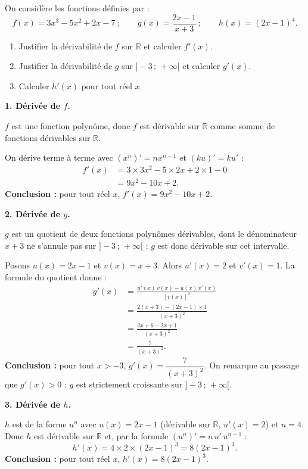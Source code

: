 \documentclass[11pt]{article}
\newcommand{\cle}[1]{{\popxbold\color{popdark}#1}}
\begin{document}
\begin{exoresolu}
On considère les fonctions définies par :
\[ f(x) = 3x^3 - 5x^2 + 2x - 7 \ ; \qquad g(x) = \frac{2x-1}{x+3} \ ; \qquad h(x) = (2x-1)^4. \]
\begin{enumerate}
\item Justifier la dérivabilité de $f$ sur $\mathbb{R}$ et calculer $f'(x)$.
\item Justifier la dérivabilité de $g$ sur $]-3\,;\,+\infty[$ et calculer $g'(x)$.
\item Calculer $h'(x)$ pour tout réel $x$.
\end{enumerate}
\tcblower
\textbf{1. Dérivée de $f$.}

$f$ est une fonction \cle{polynôme}, donc $f$ est dérivable sur $\mathbb{R}$ comme somme de fonctions dérivables sur $\mathbb{R}$.

On dérive terme à terme avec $(x^n)' = n x^{n-1}$ et $(ku)' = ku'$ :
\begin{align*}
f'(x) &= 3\times 3x^2 - 5\times 2x + 2\times 1 - 0 \\
&= 9x^2 - 10x + 2.
\end{align*}
\textbf{Conclusion :} pour tout réel $x$, $f'(x) = 9x^2 - 10x + 2$.

\textbf{2. Dérivée de $g$.}

$g$ est un \cle{quotient} de deux fonctions polynômes dérivables, dont le dénominateur $x+3$ ne s'annule pas sur $]-3\,;\,+\infty[$ : $g$ est donc dérivable sur cet intervalle.

Posons $u(x) = 2x-1$ et $v(x) = x+3$. Alors $u'(x) = 2$ et $v'(x) = 1$. La formule du quotient donne :
\begin{align*}
g'(x) &= \frac{u'(x)\,v(x) - u(x)\,v'(x)}{[v(x)]^2} \\
&= \frac{2(x+3) - (2x-1)\times 1}{(x+3)^2} \\
&= \frac{2x + 6 - 2x + 1}{(x+3)^2} \\
&= \frac{7}{(x+3)^2}.
\end{align*}
\textbf{Conclusion :} pour tout $x > -3$, $g'(x) = \dfrac{7}{(x+3)^2}$. On remarque au passage que $g'(x) > 0$ : $g$ est strictement croissante sur $]-3\,;\,+\infty[$.

\textbf{3. Dérivée de $h$.}

$h$ est de la forme $u^n$ avec $u(x) = 2x-1$ (dérivable sur $\mathbb{R}$, $u'(x)=2$) et $n = 4$. Donc $h$ est dérivable sur $\mathbb{R}$ et, par la formule $(u^n)' = n\,u'\,u^{n-1}$ :
\[ h'(x) = 4 \times 2 \times (2x-1)^3 = 8(2x-1)^3. \]
\textbf{Conclusion :} pour tout réel $x$, $h'(x) = 8(2x-1)^3$.
\end{exoresolu}
\end{document}
